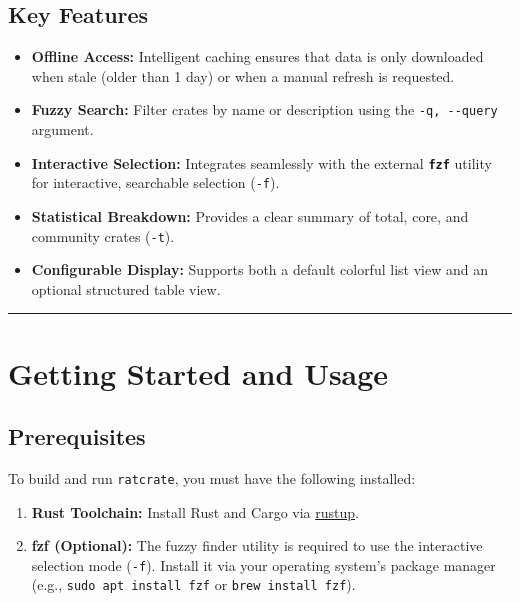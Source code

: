 \documentclass[
  letterpaper,
  DIV=11,
  numbers=noendperiod]{scrreprt}
\providecommand{\tightlist}{%
  \setlength{\itemsep}{0pt}\setlength{\parskip}{0pt}}
\begin{document}
\section{Key Features}\label{key-features}

\begin{itemize}
\tightlist
\item
  \textbf{Offline Access:} Intelligent caching ensures that data is only
  downloaded when stale (older than 1 day) or when a manual refresh is
  requested.
\item
  \textbf{Fuzzy Search:} Filter crates by name or description using the
  \texttt{-q,\ -\/-query} argument.
\item
  \textbf{Interactive Selection:} Integrates seamlessly with the
  external \textbf{\texttt{fzf}} utility for interactive, searchable
  selection (\texttt{-f}).
\item
  \textbf{Statistical Breakdown:} Provides a clear summary of total,
  core, and community crates (\texttt{-t}).
\item
  \textbf{Configurable Display:} Supports both a default colorful list
  view and an optional structured table view.
\end{itemize}

\begin{center}\rule{0.5\linewidth}{0.5pt}\end{center}

\chapter{Getting Started and Usage}\label{getting-started-and-usage}

\section{Prerequisites}\label{prerequisites}

To build and run \texttt{ratcrate}, you must have the following
installed:

\begin{enumerate}
\def\labelenumi{\arabic{enumi}.}
\tightlist
\item
  \textbf{Rust Toolchain:} Install Rust and Cargo via
  \href{https://rustup.rs/}{rustup}.
\item
  \textbf{fzf (Optional):} The fuzzy finder utility is required to use
  the interactive selection mode (\texttt{-f}). Install it via your
  operating system's package manager (e.g.,
  \texttt{sudo\ apt\ install\ fzf} or \texttt{brew\ install\ fzf}).
\end{enumerate}
\end{document}
